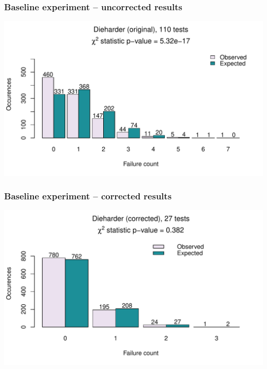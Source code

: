 \documentclass[aspectratio=169]{beamer}
\begin{document}

\begin{frame}
\frametitle{Baseline experiment -- uncorrected results}
\begin{nomar}
\centering
\includegraphics[width=.85\textwidth]{figures/dieharder-orig.pdf} 
\end{nomar}
\end{frame}

\begin{frame}
\frametitle{Baseline experiment -- corrected results}
\begin{nomar}
\centering
\includegraphics[width=.85\textwidth]{figures/dieharder-corr.pdf} 
\end{nomar}
\end{frame}
\end{document}
